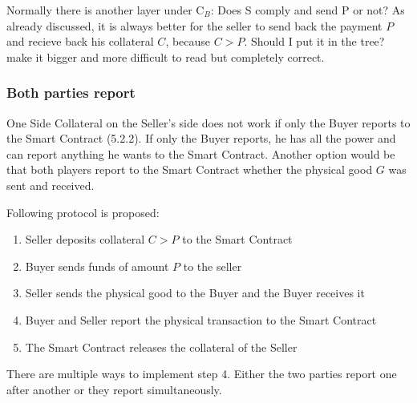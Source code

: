 \documentclass{cacthesis}
\begin{document}


Normally there is another layer under C$_B$: Does S comply and send P or not? As already discussed, it is always better for the seller to send back the payment $P$ and recieve back his collateral $C$, because $C>P$. Should I put it in the tree? make it bigger and more difficult to read but completely correct.


\subsubsection{Both parties report}
One Side Collateral on the Seller's side does not work if only the Buyer reports to the Smart Contract (5.2.2). If only the Buyer reports, he has all the power and can report anything he wants to the Smart Contract.\newline
Another option would be that both players report to the Smart Contract whether the physical good $G$ was sent and received.\newline 

Following protocol is proposed:
\begin{enumerate}
    \item Seller deposits collateral $C > P$ to the Smart Contract
    \item Buyer sends funds of amount $P$ to the seller 
    \item Seller sends the physical good to the Buyer and the Buyer receives it
    \item Buyer and Seller report the physical transaction to the Smart Contract
    \item The Smart Contract releases the collateral of the Seller
\end{enumerate}
There are multiple ways to implement step 4. Either the two parties report one after another or they report simultaneously.
\end{document}
